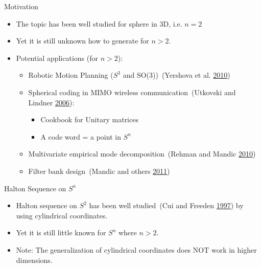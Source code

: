 \documentclass[10pt,ignorenonframetext,serif,onlymath]{beamer}
\begin{document}
\begin{frame}{Motivation}
\protect\hypertarget{motivation}{}

\begin{itemize}
\item
  The topic has been well studied for sphere in 3D, i.e. \(n=2\)
\item
  Yet it is still unknown how to generate for \(n > 2\).
\item
  Potential applications (for \(n > 2\)):

  \begin{itemize}
  \item
    Robotic Motion Planning (\(S^3\) and SO(3))~(Yershova et al.
    \protect\hyperlink{ref-yershova2010generating}{2010})
  \item
    Spherical coding in MIMO wireless communication~(Utkovski and
    Lindner \protect\hyperlink{ref-utkovski2006construction}{2006}):

    \begin{itemize}
    \item
      Cookbook for Unitary matrices
    \item
      A code word = a point in \(S^n\)
    \end{itemize}
  \item
    Multivariate empirical mode decomposition~(Rehman and Mandic
    \protect\hyperlink{ref-rehman2010multivariate}{2010})
  \item
    Filter bank design~(Mandic and others
    \protect\hyperlink{ref-mandic2011filter}{2011})
  \end{itemize}
\end{itemize}

\end{frame}

\begin{frame}{Halton Sequence on \(S^n\)}
\protect\hypertarget{halton-sequence-on-sn}{}

\begin{itemize}
\item
  Halton sequence on \(S^2\) has been well studied~(Cui and Freeden
  \protect\hyperlink{ref-cui1997equidistribution}{1997}) by using
  cylindrical coordinates.
\item
  Yet it is still little known for \(S^n\) where \(n>2\).
\item
  Note: The generalization of cylindrical coordinates does NOT work in
  higher dimensions.
\end{itemize}

\end{frame}
\end{document}
